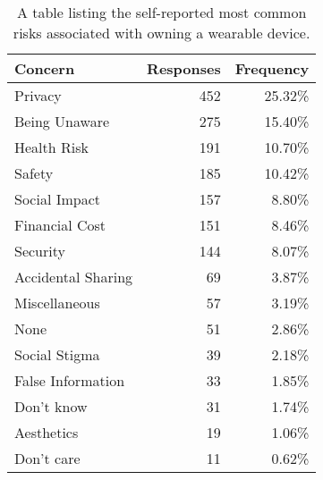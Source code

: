 \begin{table}[t]
\begin{center}
\begin{tabular}{|l|r|r|}
\hline
Concern &  Responses &  Frequency   \\
\hline
Privacy & 452 & 25.32\% \\
Being Unaware & 275 & 15.40\% \\
Health Risk & 191 & 10.70\%\\
Safety & 185 & 10.42\%\\
Social Impact &	157 & 8.80\%\\
Financial Cost & 151 & 8.46\%\\
Security &	144 & 8.07\%\\
Accidental Sharing &	69 & 3.87\%\\
Miscellaneous &	57 & 3.19\%\\
None	& 51 & 2.86\%\\
Social Stigma &	39 & 2.18\%\\
False Information & 33 & 1.85\%\\
Don't know & 31 & 1.74\%\\
Aesthetics 	& 19 & 1.06\%\\
Don't care 	& 11 & 0.62\%\\
\hline
\end{tabular}
\caption{A table listing the self-reported most common risks associated with owning a wearable device.}
\label{openresponses}
\end{center}
\end{table}